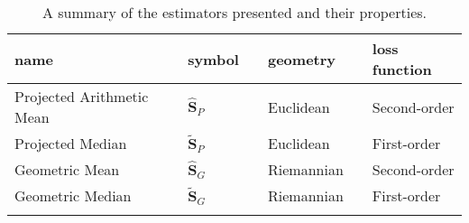 \begin{table}[h]
\caption{A summary of the estimators presented and their properties.  \label{tab:ests.sum}}
\begin{center}
\begin{tabular}{ lclclcl}\hline
\rule[2mm]{0mm}{1mm} \textbf{name} & & \textbf{symbol} & & \textbf{geometry} &&\textbf{loss function}\\ \hline \hline 
\rule[2mm]{0mm}{6mm} Projected Arithmetic Mean & & $\widehat{\bm S}_P$ & & Euclidean &&Second-order  \\
\rule[2mm]{0mm}{6mm} Projected Median & & $\widetilde{\bm S}_P$ & & Euclidean && First-order \\
\rule[2mm]{0mm}{6mm} Geometric Mean & & $\widehat{\bm S}_G$&  & Riemannian && Second-order\\
\rule[2mm]{0mm}{6mm} Geometric Median & & $\widetilde{\bm S}_G$&  & Riemannian &&First-order \\[-7mm] 
\rule[2mm]{0mm}{6mm} & & & & \\ \hline
\end{tabular}
\end{center}
\end{table}
